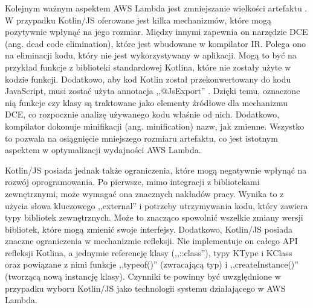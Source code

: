 Kolejnym ważnym aspektem AWS Lambda jest zmniejszanie wielkości artefaktu \cite{8116416}\cite{9095731}.
W przypadku Kotlin/JS oferowane jest kilka mechanizmów, które mogą pozytywnie wpłynąć na jego rozmiar.
Między innymi zapewnia on narzędzie DCE (ang. dead code elimination), które jest wbudowane w kompilator IR.
Polega ono na eliminacji kodu, który nie jest wykorzystywany w aplikacji.
Mogą to być na przykład funkcje z biblioteki standardowej Kotlina, które nie zostały użyte w kodzie funkcji.
Dodatkowo, aby kod Kotlin został przekonwertowany do kodu JavaScript, musi zostać użyta annotacja ,,@JsExport'' \cite{kotlinlangKotlinDocs}.
Dzięki temu, oznaczone nią funkcje czy klasy są traktowane jako elementy źródłowe dla mechanizmu DCE, co rozpocznie analizę używanego kodu właśnie od nich.
Dodatkowo, kompilator dokonuje minifikacji (ang. minification) nazw, jak zmienne.
Wszystko to pozwala na osiągnięcie mniejszego rozmiaru artefaktu, co jest istotnym aspektem w optymalizacji wydajności AWS Lambda.

Kotlin/JS posiada jednak także ograniczenia, które mogą negatywnie wpłynąć na rozwój oprogramowania.
Po pierwsze, mimo integracji z bibliotekami zewnętrznymi, może wymagać ona znacznych nakładów pracy.
Wynika to z użycia słowa kluczowego ,,external'' i potrzeby utrzymywania kodu, który zawiera typy bibliotek zewnętrznych.
Może to znacząco spowolnić wszelkie zmiany wersji bibliotek, które mogą zmienić swoje interfejsy.
Dodatkowo, Kotlin/JS posiada znaczne ograniczenia w mechanizmie refleksji.
Nie implementuje on całego API refleksji Kotlina, a jednymie referencję klasy (,,::class''), typy KType i KClass oraz powiązane z nimi funkcje ,,typeof()'' (zwracającą typ) i ,,createInstance()'' (tworzącą nową instancję klasy).
Czynniki te powinny być uwzględnione w przypadku wyboru Kotlin/JS jako technologii systemu działającego w AWS Lambda.
